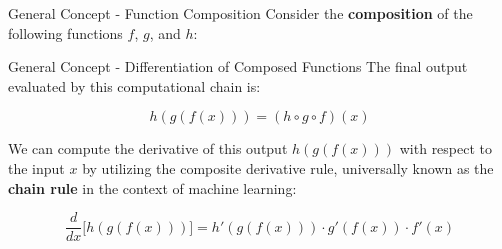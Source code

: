 \begin{frame}{General Concept - Function Composition}
	Consider the \textbf{composition} of the following functions $f$, $g$, and $h$:
	\begin{center}
	\end{center}
\end{frame}

\begin{frame}{General Concept - Differentiation of Composed Functions}
	The final output evaluated by this computational chain is:
	
	\begin{equation*}
		h(g(f(x))) = (h \circ g \circ f)(x)
	\end{equation*}
	
	\pause
	
	We can compute the derivative of this output $h(g(f(x)))$ with respect to the input $x$ by utilizing the composite derivative rule, universally known as the \textbf{chain rule} in the context of machine learning:
	
	\begin{equation*}
		\frac{d}{dx} \Big[ h(g(f(x))) \Big] = h'(g(f(x))) \cdot g'(f(x)) \cdot f'(x)
	\end{equation*}
	
\end{frame}

